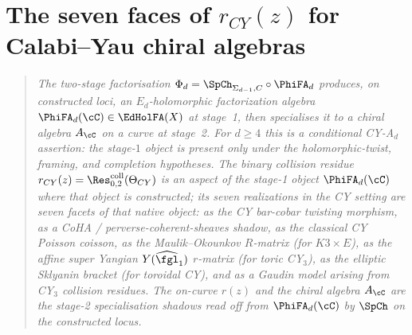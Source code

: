 
\label{thm:gz26-commuting-differentials}%
\label{thm:gaudin-yangian-identification}%
\label{thm:yangian-sklyanin-quantization}%
\label{thm:dnp-bar-cobar-identification}%
\label{thm:kz-classical-quantum-bridge}%
\label{thm:shadow-depth-operator-order}%
\label{thm:vol1-seven-face-master}%
\label{thm:vol2-seven-face-master}%
\label{def:p-max}%
\label{def:k-max}%
\label{def:r-max}%

\chapter{The seven faces of \texorpdfstring{$r_{CY}(z)$}{r-CY(z)} for Calabi--Yau chiral algebras}
\label{ch:cy-holographic-datum-master}

\begin{quote}\itshape
The two-stage factorisation $\Phi_d = \SpCh_{\Sigma_{d-1},C} \circ \PhiFA_d$
produces, on constructed loci, an $E_d$-holomorphic factorization algebra
$\PhiFA_d(\cC) \in \EdHolFA(X)$ at stage~1, then specialises it to a
chiral algebra $A_\cC$ on a curve at stage~2. For $d\geq4$ this is a
conditional CY-A$_d$ assertion: the stage-$1$ object is present only
under the holomorphic-twist, framing, and completion hypotheses.
The binary collision residue
$r_{CY}(z) = \Res^{\mathrm{coll}}_{0,2}(\Theta_{CY})$
is an aspect of the stage-1 object $\PhiFA_d(\cC)$ where that object is
constructed; its seven realizations in the CY setting are seven facets
of that native object:
as the CY bar-cobar twisting morphism, as a CoHA / perverse-coherent-sheaves shadow,
as the classical CY Poisson coisson, as the Maulik--Okounkov $R$-matrix
(for $K3 \times E$), as the affine super Yangian $Y(\widehat{\fgl}_1)$
$r$-matrix (for toric CY$_3$), as the elliptic Sklyanin bracket
(for toroidal CY), and as a Gaudin model arising from CY$_3$ collision
residues. The on-curve $r(z)$ and the chiral algebra $A_\cC$ are the stage-2
specialisation shadows read off from $\PhiFA_d(\cC)$ by $\SpCh$ on the
constructed locus.
\end{quote}

